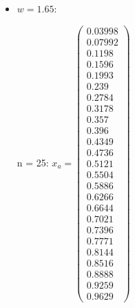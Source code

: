 \documentclass{udpreport}
\begin{document}
\begin{enumerate}
\begin {enumerate}
\begin{enumerate}
\begin{itemize}
\begin{itemize}
				\item $w = 1.65$:
				
				n = 25: $x_{a} = \left(\begin{array}{c} 0.03998\\ 0.07992\\ 0.1198\\ 0.1596\\ 0.1993\\ 0.239\\ 0.2784\\ 0.3178\\ 0.357\\ 0.396\\ 0.4349\\ 0.4736\\ 0.5121\\ 0.5504\\ 0.5886\\ 0.6266\\ 0.6644\\ 0.7021\\ 0.7396\\ 0.7771\\ 0.8144\\ 0.8516\\ 0.8888\\ 0.9259\\ 0.9629 \end{array}\right)$

\end{itemize}
\end{itemize}
\end{enumerate}
\end{enumerate}
\end{enumerate}
\end{document}
